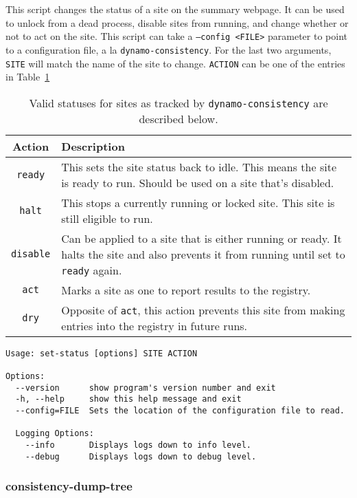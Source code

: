 This script changes the status of a site on the summary webpage.
It can be used to unlock from a dead process, disable sites from running,
and change whether or not to act on the site.
This script can take a \texttt{--config <FILE>} parameter to point
to a configuration file, a la \texttt{dynamo-consistency}.
For the last two arguments, \texttt{SITE} will match
the name of the site to change.
\texttt{ACTION} can be one of the entries in Table~\ref{tab:status-actions}
%
\begin{table}
  \caption[\texttt{dynamo-consistency} site statuses]{
    Valid statuses for sites as tracked by \texttt{dynamo-consistency}
    are described below.
  }
  {\renewcommand{\arraystretch}{1.5}
  \begin{tabularx}{\textwidth}{|c|X|}
    \hline
    Action & Description \\
    \hline
    \hline
    \texttt{ready} &
    This sets the site status back to idle.
    This means the site is ready to run.
    Should be used on a site that's disabled. \\
    \hline
    \texttt{halt} &
    This stops a currently running or locked site.
    This site is still eligible to run. \\
    \hline
    \texttt{disable} &
    Can be applied to a site that is either running or ready.
    It halts the site and also prevents it from running until set to \texttt{ready} again. \\
    \hline
    \texttt{act} &
    Marks a site as one to report results to the registry. \\
    \hline
    \texttt{dry} &
    Opposite of \texttt{act},
    this action prevents this site from making entries into the registry in future runs. \\
    \hline
  \end{tabularx}}
  \label{tab:status-actions}
\end{table}
{\small
\begin{verbatim}
Usage: set-status [options] SITE ACTION

Options:
  --version      show program's version number and exit
  -h, --help     show this help message and exit
  --config=FILE  Sets the location of the configuration file to read.

  Logging Options:
    --info       Displays logs down to info level.
    --debug      Displays logs down to debug level.
\end{verbatim}
}

\subsubsection{consistency-dump-tree}

